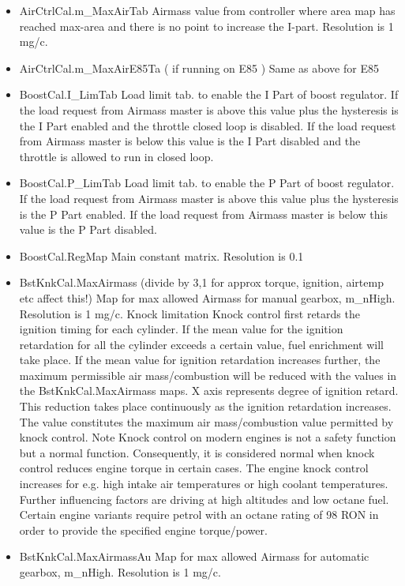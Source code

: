 \documentclass[11pt,a4paper]{book}
\begin{document}
\begin{itemize}
    \item
AirCtrlCal.m\_MaxAirTab
Airmass value from controller where area map has reached max-area and there is no point to increase
the I-part. Resolution is 1 mg/c.
    \item
AirCtrlCal.m\_MaxAirE85Ta ( if running on E85 )
Same as above for E85
    \item
BoostCal.I\_LimTab
Load limit tab. to enable the I Part of boost regulator. If the load request from Airmass master is
above this value plus the hysteresis is the I Part enabled and the throttle closed loop is disabled. If
the load request from Airmass master is below this value is the I Part disabled and the throttle is
allowed to run in closed loop.
    \item
BoostCal.P\_LimTab
Load limit tab. to enable the P Part of boost regulator. If the load request from Airmass master is
above this value plus the hysteresis is the P Part enabled. If the load request from Airmass master is
below this value is the P Part disabled.
    \item
BoostCal.RegMap
Main constant matrix. Resolution is 0.1 %
    \item
BstKnkCal.MaxAirmass (divide by 3,1 for approx torque, ignition, airtemp etc affect this!)
Map for max allowed Airmass for manual gearbox, m\_nHigh. Resolution is 1 mg/c.
Knock limitation
Knock control first retards the ignition timing for each cylinder. If the mean value for the ignition
retardation for all the cylinder exceeds a certain value, fuel enrichment will take place.
If the mean value for ignition retardation increases further, the maximum permissible air
mass/combustion will be reduced with the values in the BstKnkCal.MaxAirmass maps. X axis
represents degree of ignition retard. This reduction takes place continuously as the ignition retardation
increases. The value constitutes the maximum air mass/combustion value permitted by knock control.
Note
Knock control on modern engines is not a safety function but a normal function. Consequently, it is
considered normal when knock control reduces engine torque in certain cases. The engine knock
control increases for e.g. high intake air temperatures or high coolant temperatures. Further
influencing factors are driving at high altitudes and low octane fuel.
Certain engine variants require petrol with an octane rating of 98 RON in order to provide the
specified engine torque/power.
    \item
BstKnkCal.MaxAirmassAu
Map for max allowed Airmass for automatic gearbox, m\_nHigh. Resolution is 1 mg/c.

\end{itemize}
\end{document}

